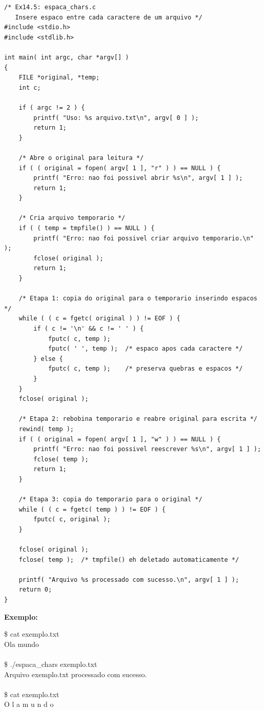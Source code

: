 \documentclass[12pt,a4paper]{article}
\begin{document}
\begin{respostabox}
\begin{lstlisting}
/* Ex14.5: espaca_chars.c
   Insere espaco entre cada caractere de um arquivo */
#include <stdio.h>
#include <stdlib.h>

int main( int argc, char *argv[] )
{
    FILE *original, *temp;
    int c;

    if ( argc != 2 ) {
        printf( "Uso: %s arquivo.txt\n", argv[ 0 ] );
        return 1;
    }

    /* Abre o original para leitura */
    if ( ( original = fopen( argv[ 1 ], "r" ) ) == NULL ) {
        printf( "Erro: nao foi possivel abrir %s\n", argv[ 1 ] );
        return 1;
    }

    /* Cria arquivo temporario */
    if ( ( temp = tmpfile() ) == NULL ) {
        printf( "Erro: nao foi possivel criar arquivo temporario.\n" );
        fclose( original );
        return 1;
    }

    /* Etapa 1: copia do original para o temporario inserindo espacos */
    while ( ( c = fgetc( original ) ) != EOF ) {
        if ( c != '\n' && c != ' ' ) {
            fputc( c, temp );
            fputc( ' ', temp );  /* espaco apos cada caractere */
        } else {
            fputc( c, temp );    /* preserva quebras e espacos */
        }
    }
    fclose( original );

    /* Etapa 2: rebobina temporario e reabre original para escrita */
    rewind( temp );
    if ( ( original = fopen( argv[ 1 ], "w" ) ) == NULL ) {
        printf( "Erro: nao foi possivel reescrever %s\n", argv[ 1 ] );
        fclose( temp );
        return 1;
    }

    /* Etapa 3: copia do temporario para o original */
    while ( ( c = fgetc( temp ) ) != EOF ) {
        fputc( c, original );
    }

    fclose( original );
    fclose( temp );  /* tmpfile() eh deletado automaticamente */

    printf( "Arquivo %s processado com sucesso.\n", argv[ 1 ] );
    return 0;
}
\end{lstlisting}

\textbf{Exemplo:}
\begin{saida}
\$ cat exemplo.txt\\
Ola mundo\\
\\
\$ ./espaca\_chars exemplo.txt\\
Arquivo exemplo.txt processado com sucesso.\\
\\
\$ cat exemplo.txt\\
O l a  m u n d o
\end{saida}


\end{respostabox}
\end{document}

